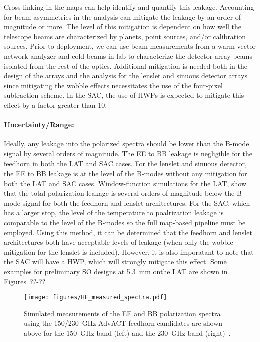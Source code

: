 Cross-linking in the maps can help identify and quantify this leakage. Accounting for beam asymmetries in the analysis can mitigate the leakage by an order of magnitude or more. The level of this mitigation is dependent on how well the telescope beams are characterized by planets, point sources, and/or calibration sources. Prior to deployment, we can use beam measurements from a warm vector network analyzer and cold beams in lab to characterize the detector array beams isolated from the rest of the optics. Additional mitigation is needed both in the design of the arrays and the analysis for the lenslet and sinuous detector arrays since mitigating the wobble effects necessitates the use of the four-pixel subtraction scheme. In the SAC, the use of HWPs is expected to mitigate this effect by a factor greater than 10.


\paragraph{Uncertainty/Range:}
Ideally, any leakage into the polarized spectra should be lower than the B-mode signal by several orders of magnitude. The EE to BB leakage is negligible for the feedhorn in both the LAT and SAC cases. For the lenslet and sinuous detector, the EE to BB leakage is at the level of the B-modes without any mitigation for both the LAT and SAC cases. Window-function simulations for the LAT, show that the total polarization leakage is several orders of magnitude below the B-mode signal for both the feedhorn and lenslet architectures. For the SAC, which has a larger stop, the level of the temperature to poalrization leakage is comparable to the level of the B-modes so the full map-based pipeline must be employed. Using this method, it can be determined that the feedhorn and lenslet architectures both have acceptable levels of leakage (when only the wobble mitigation for the lenslet is included). However, it is also imporatant to note that the SAC will have a HWP, which will strongly mitigate this effect. Some examples for preliminary SO designs at 5.3~mm onthe LAT are shown in Figures~??-??


\begin{figure}[h!]
\centering
\texttt{[image: figures/HF\_measured\_spectra.pdf]}
\caption{Simulated measurements of the EE and BB polarization spectra using the 150/230~GHz AdvACT feedhorn candidates are shown above for the 150~GHz band (left) and the 230~GHz band (right)~\cite{Simon_Thesis_2016}.}
\label{fig:HF_measured_spectra}
\end{figure}

